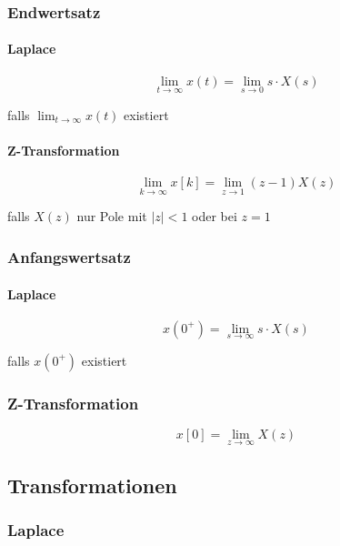 \documentclass[
  10pt,
  a4paper,
  twocolumn]{article}
\let\oldparagraph\paragraph
\renewcommand{\paragraph}[1]{\oldparagraph{#1}\mbox{}}
\numberwithin{equation}{section}
\let\paragraph\oldparagraph
\renewcommand{\paragraph}[1]{\oldparagraph{#1}\mbox{}\par}
\begin{document}
\subsubsection{Endwertsatz}\label{endwertsatz}

\paragraph{Laplace}\label{laplace}

\[
\lim_{t\rightarrow\infty}x(t)=\lim_{s\rightarrow0} s\cdot X(s)
\]

falls \(\lim_{t\rightarrow\infty} x(t)\) existiert

\paragraph{Z-Transformation}\label{z-transformation}

\[
\lim_{k\rightarrow\infty}x[k]=\lim_{z\rightarrow1}(z-1)X(z)
\]

falls \(X(z)\) nur Pole mit \(\lvert z\rvert < 1\) oder bei \(z=1\)

\subsubsection{Anfangswertsatz}\label{anfangswertsatz}

\paragraph{Laplace}\label{laplace-1}

\[
x(0^+)=\lim_{s\rightarrow\infty}s\cdot X(s)
\]

falls \(x(0^+)\) existiert

\subsubsection{Z-Transformation}\label{z-transformation-1}

\[
x[0]=\lim_{z\rightarrow\infty}X(z)
\]

\subsection{Transformationen}\label{transformationen}

\subsubsection{Laplace}\label{laplace-2}
\end{document}
